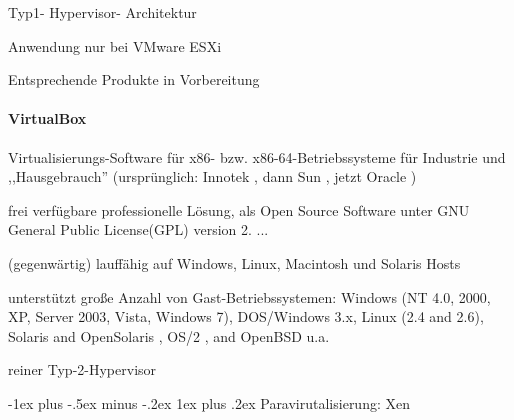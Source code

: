 \documentclass[a4paper]{article}
\makeatletter
\renewcommand{\subsubsection}{\@startsection{subsubsection}{3}{0mm}%
 {-1ex plus -.5ex minus -.2ex}%
 {1ex plus .2ex}%
 {\normalfont\small\bfseries}}
\makeatother
\begin{document}
\begin{multicols}{3}
\begin{itemize*}
        \begin{itemize*}
            \item Typ1- Hypervisor- Architektur
            \item Anwendung nur bei VMware ESXi
        \end{itemize*}
        \begin{itemize*}
            \item Entsprechende Produkte in Vorbereitung
        \end{itemize*}
    \end{itemize*}


    \paragraph{VirtualBox}

    \begin{itemize*}
        \item Virtualisierungs-Software für x86- bzw. x86-64-Betriebssysteme für
        Industrie und ,,Hausgebrauch'' (ursprünglich: Innotek , dann Sun ,
        jetzt Oracle )
        \item frei verfügbare professionelle Lösung, als Open Source Software unter
        GNU General Public License(GPL) version 2. ...
        \item (gegenwärtig) lauffähig auf Windows, Linux, Macintosh und Solaris
        Hosts
        \item unterstützt große Anzahl von Gast-Betriebssystemen: Windows (NT 4.0,
        2000, XP, Server 2003, Vista, Windows 7), DOS/Windows 3.x, Linux (2.4
        and 2.6), Solaris and OpenSolaris , OS/2 , and OpenBSD u.a.
        \item reiner Typ-2-Hypervisor
    \end{itemize*}


    \subsubsection{Paravirutalisierung: Xen}


\end{multicols}
\end{document}
